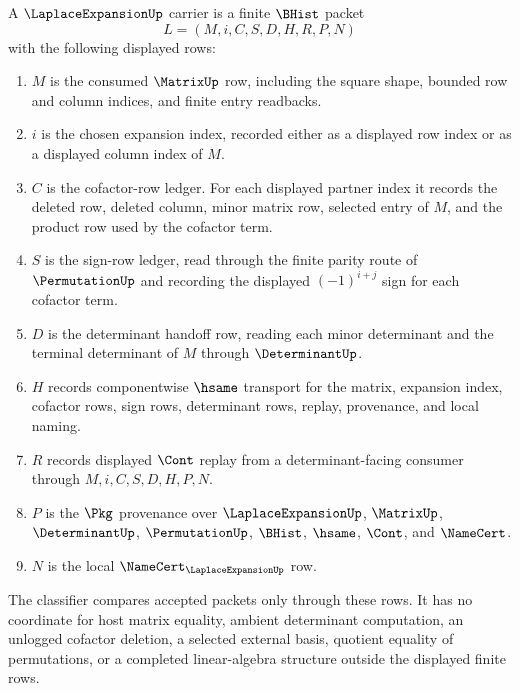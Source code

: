 \begin{definition}
\label{def:laplace-expansion-carrier}
A $\LaplaceExpansionUp$ carrier is a finite $\BHist$ packet
$$
L=(M,i,C,S,D,H,R,P,N)
$$
with the following displayed rows:
\begin{enumerate}
\item $M$ is the consumed $\MatrixUp$ row, including the square shape, bounded row and column indices, and finite entry readbacks.
\item $i$ is the chosen expansion index, recorded either as a displayed row index or as a displayed column index of $M$.
\item $C$ is the cofactor-row ledger. For each displayed partner index it records the deleted row, deleted column, minor matrix row, selected entry of $M$, and the product row used by the cofactor term.
\item $S$ is the sign-row ledger, read through the finite parity route of $\PermutationUp$ and recording the displayed $(-1)^{i+j}$ sign for each cofactor term.
\item $D$ is the determinant handoff row, reading each minor determinant and the terminal determinant of $M$ through $\DeterminantUp$.
\item $H$ records componentwise $\hsame$ transport for the matrix, expansion index, cofactor rows, sign rows, determinant rows, replay, provenance, and local naming.
\item $R$ records displayed $\Cont$ replay from a determinant-facing consumer through $M,i,C,S,D,H,P,N$.
\item $P$ is the $\Pkg$ provenance over $\LaplaceExpansionUp$, $\MatrixUp$, $\DeterminantUp$, $\PermutationUp$, $\BHist$, $\hsame$, $\Cont$, and $\NameCert$.
\item $N$ is the local $\NameCert_{\LaplaceExpansionUp}$ row.
\end{enumerate}
The classifier compares accepted packets only through these rows. It has no coordinate for host matrix equality, ambient determinant computation, an unlogged cofactor deletion, a selected external basis, quotient equality of permutations, or a completed linear-algebra structure outside the displayed finite rows.
\end{definition}

